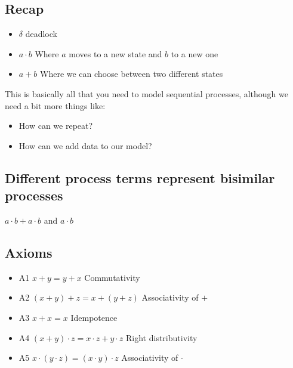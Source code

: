 \subsection{Recap}

\begin{itemize}
  \item $\delta$ deadlock
  \item $a \cdot b$ Where $a$ moves to a new state and $b$ to a new one
  \item $a + b$ Where we can choose between two different states
\end{itemize}

This is basically all that you need to model sequential processes, although we need a bit more
things like:
\begin{itemize}
  \item How can we repeat?
  \item How can we add data to our model?
\end{itemize}

\subsection{Different process terms represent bisimilar processes}
$a \cdot b + a \cdot b$ and $a \cdot b$

\begin{figure}[H]
  \centering
\end{figure}

\subsection{Axioms}

\begin{itemize}
  \item A1 $x + y = y + x$ Commutativity
  \item A2 $(x + y) + z = x + (y + z)$ Associativity of $+$
  \item A3 $x + x = x$ Idempotence
  \item A4 $(x + y) \cdot z = x \cdot z + y \cdot z$ Right distributivity
  \item A5 $x \cdot (y \cdot z) = (x \cdot y) \cdot z$ Associativity of $\cdot$
\end{itemize}

